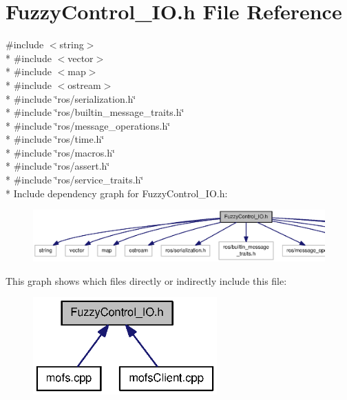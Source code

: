 \section{Fuzzy\-Control\-\_\-\-I\-O.\-h File Reference}
\label{FuzzyControl__IO_8h}
{\ttfamily \#include $<$string$>$}\\*
{\ttfamily \#include $<$vector$>$}\\*
{\ttfamily \#include $<$map$>$}\\*
{\ttfamily \#include $<$ostream$>$}\\*
{\ttfamily \#include \char`\"{}ros/serialization.\-h\char`\"{}}\\*
{\ttfamily \#include \char`\"{}ros/builtin\-\_\-message\-\_\-traits.\-h\char`\"{}}\\*
{\ttfamily \#include \char`\"{}ros/message\-\_\-operations.\-h\char`\"{}}\\*
{\ttfamily \#include \char`\"{}ros/time.\-h\char`\"{}}\\*
{\ttfamily \#include \char`\"{}ros/macros.\-h\char`\"{}}\\*
{\ttfamily \#include \char`\"{}ros/assert.\-h\char`\"{}}\\*
{\ttfamily \#include \char`\"{}ros/service\-\_\-traits.\-h\char`\"{}}\\*
Include dependency graph for Fuzzy\-Control\-\_\-\-I\-O.\-h\-:\nopagebreak
\begin{figure}[H]
\begin{center}
\leavevmode
\includegraphics[width=350pt]{FuzzyControl__IO_8h__incl}
\end{center}
\end{figure}
This graph shows which files directly or indirectly include this file\-:\nopagebreak
\begin{figure}[H]
\begin{center}
\leavevmode
\includegraphics[width=200pt]{FuzzyControl__IO_8h__dep__incl}
\end{center}
\end{figure}
